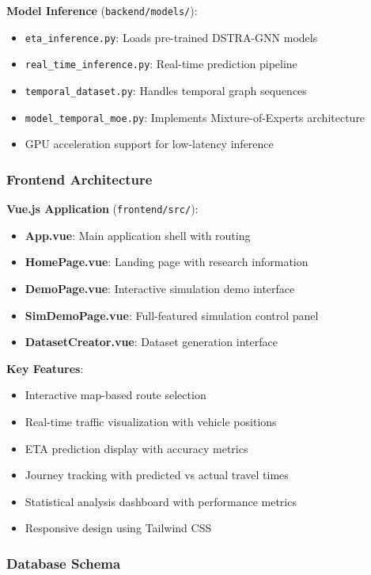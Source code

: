 \textbf{Model Inference} (\texttt{backend/models/}):
\begin{itemize}
    \item \texttt{eta\_inference.py}: Loads pre-trained DSTRA-GNN models
    \item \texttt{real\_time\_inference.py}: Real-time prediction pipeline
    \item \texttt{temporal\_dataset.py}: Handles temporal graph sequences
    \item \texttt{model\_temporal\_moe.py}: Implements Mixture-of-Experts architecture
    \item GPU acceleration support for low-latency inference
\end{itemize}

\subsubsection{Frontend Architecture}

\textbf{Vue.js Application} (\texttt{frontend/src/}):
\begin{itemize}
    \item \textbf{App.vue}: Main application shell with routing
    \item \textbf{HomePage.vue}: Landing page with research information
    \item \textbf{DemoPage.vue}: Interactive simulation demo interface
    \item \textbf{SimDemoPage.vue}: Full-featured simulation control panel
    \item \textbf{DatasetCreator.vue}: Dataset generation interface
\end{itemize}

\textbf{Key Features}:
\begin{itemize}
    \item Interactive map-based route selection
    \item Real-time traffic visualization with vehicle positions
    \item ETA prediction display with accuracy metrics
    \item Journey tracking with predicted vs actual travel times
    \item Statistical analysis dashboard with performance metrics
    \item Responsive design using Tailwind CSS
\end{itemize}

\subsubsection{Database Schema}


